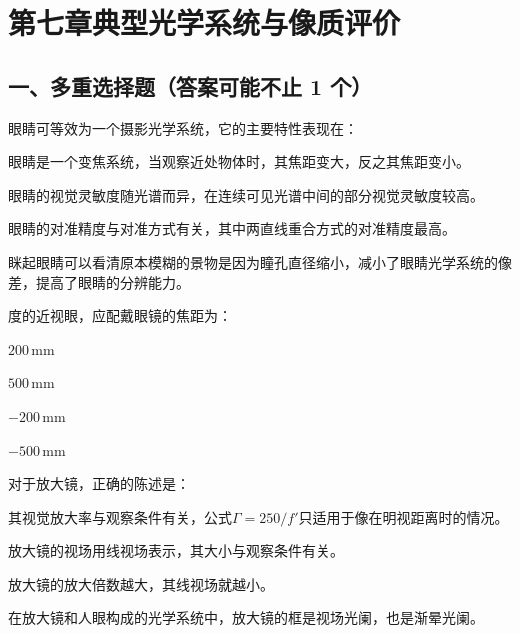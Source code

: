 \documentclass[padl, analysis, notocnum]{ExBook}
\newcommand{\answerarea}[1][3.5cm]{%
  \par\vspace{1mm}%
  \noindent{\color{themeColor!35}\rule{\linewidth}{0.4pt}}\par
  \noindent\begin{minipage}[t][#1][t]{\linewidth}\vspace{0pt}\end{minipage}\par
  \noindent{\color{themeColor!35}\rule{\linewidth}{0.4pt}}\par
}
\begin{document}
\section{第七章\quad 典型光学系统与像质评价}
\subsection{一、多重选择题（答案可能不止 1 个）}
\begin{qitems}[startnum=1]
\qitem 眼睛可等效为一个摄影光学系统，它的主要特性表现在：
\par\noindent\hspace{2em}眼睛是一个变焦系统，当观察近处物体时，其焦距变大，反之其焦距变小。
\par\noindent\hspace{2em}眼睛的视觉灵敏度随光谱而异，在连续可见光谱中间的部分视觉灵敏度较高。
\par\noindent\hspace{2em}眼睛的对准精度与对准方式有关，其中两直线重合方式的对准精度最高。
\par\noindent\hspace{2em}眯起眼睛可以看清原本模糊的景物是因为瞳孔直径缩小，减小了眼睛光学系统的像差，提高了眼睛的分辨能力。
\label{q:131:start}
\answerarea[4.0cm]
\label{q:131:end}
\end{qitems}

\begin{qitems}[startnum=2]
 度的近视眼，应配戴眼镜的焦距为：
\par\noindent\hspace{2em}$200\,\mathrm{mm}$
\par\noindent\hspace{2em}$500\,\mathrm{mm}$
\par\noindent\hspace{2em}$-200\,\mathrm{mm}$
\par\noindent\hspace{2em}$-500\,\mathrm{mm}$
\label{q:132:start}
\answerarea[4.0cm]
\label{q:132:end}
\end{qitems}

\begin{qitems}[startnum=3]
\qitem 对于放大镜，正确的陈述是：
\par\noindent\hspace{2em}其视觉放大率与观察条件有关，公式$\Gamma =250/f'$只适用于像在明视距离时的情况。
\par\noindent\hspace{2em}放大镜的视场用线视场表示，其大小与观察条件有关。
\par\noindent\hspace{2em}放大镜的放大倍数越大，其线视场就越小。
\par\noindent\hspace{2em}在放大镜和人眼构成的光学系统中，放大镜的框是视场光阑，也是渐晕光阑。
\label{q:133:start}
\answerarea[4.0cm]
\label{q:133:end}
\end{qitems}
\end{document}
